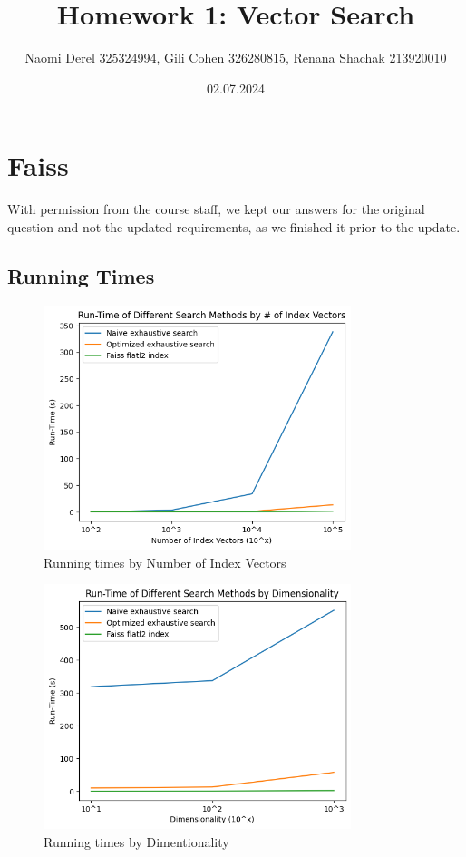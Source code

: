 \documentclass[12pt]{article}
\begin{document}
\title{Homework 1: Vector Search}
\author{Naomi Derel 325324994, Gili Cohen 326280815, Renana Shachak 213920010}
\date{02.07.2024}
\maketitle


\section{Faiss}

With permission from the course staff, we kept our answers for the original question and not the updated requirements, as we finished it prior to the update.

\subsection{Running Times}

\begin{figure}[H]
    \centering
    \includegraphics[width=0.8\textwidth]{images/1_1_1.png}
    \caption{Running times by Number of Index Vectors}
\end{figure}

\begin{figure}[H]
    \centering
    \includegraphics[width=0.8\textwidth]{images/1_1_2.png}
    \caption{Running times by Dimentionality}
\end{figure}
\end{document}
